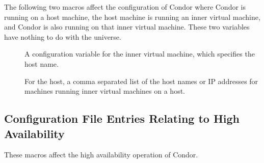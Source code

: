 The following two macros affect the configuration of Condor where Condor is
running on a host machine, the host machine is running an
inner virtual machine,
and Condor is also running on that inner virtual machine.
These two variables have nothing to do with the 
universe.

\begin{description}
\item[]
\label{param:VMPHostMachine}
A configuration variable for the inner virtual machine,
which specifies the host name.

\item[]
\label{param:VMPVMList}
For the host, 
a comma separated list of the host names or IP addresses
for machines running inner virtual machines on a host.
\end{description}

\subsection{\label{sec:HA-Config-File-Entries}Configuration File Entries
Relating to High Availability}

These macros affect the high availability operation of Condor.

